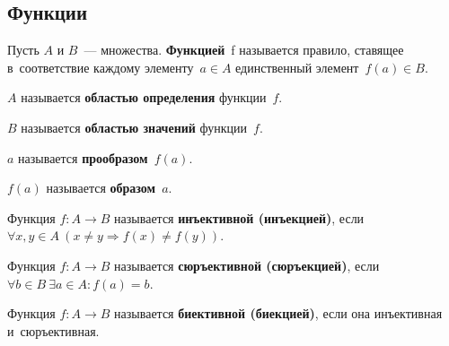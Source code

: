 \subsection{Функции}
\begin{definition}
	Пусть $A$ и $B$~--- множества.
	\textbf{Функцией}~f называется правило, ставящее в~соответствие каждому элементу~$a \in A$ единственный элемент~$f(a) \in B$.
	
	$A$ называется \textbf{областью определения} функции~$f$.
	
	$B$ называется \textbf{областью значений} функции~$f$.
	
	$a$ называется \textbf{прообразом}~$f(a)$.
	
	$f(a)$ называется \textbf{образом}~$a$.
\end{definition}

\begin{definition}
	Функция $f \colon A \to B$ называется \textbf{инъективной (инъекцией)}, если
	$\forall x, y \in A	\ \allowbreak (x \neq y \Rightarrow f(x) \neq f(y))$.
\end{definition}

\begin{definition}
	Функция $f \colon A \to B$ называется \textbf{сюръективной (сюръекцией)}, если
	$\forall b \in B \ \allowbreak \exists a \in A \colon \allowbreak f(a) = b$.
\end{definition}

\begin{definition}
	Функция $f \colon A \to B$ называется \textbf{биективной (биекцией)}, если она инъективная
	и~сюръективная.
\end{definition}